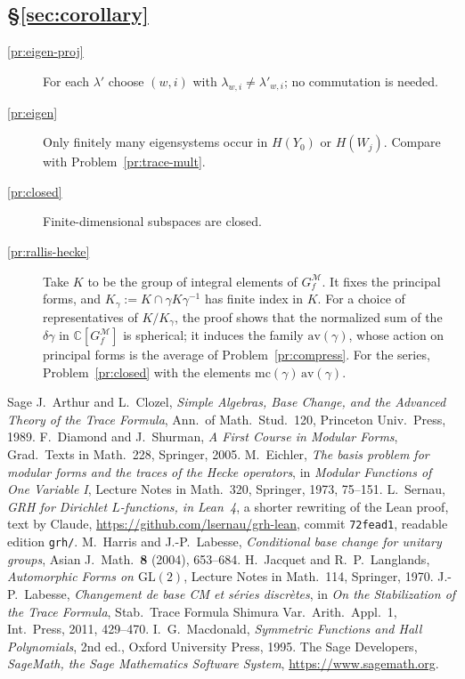 \documentclass[reqno]{amsart}
\theoremstyle{plain}
\theoremstyle{definition}
\newcommand{\C}{\mathbb{C}}
\newcommand{\Mcal}{\mathcal{M}}
\begin{document}
\subsection*{\S\ref{sec:corollary}}
\begin{description}
\item[\ref{pr:eigen-proj}] For each \(\lambda'\) choose \((w, i)\) with \(\lambda_{w,i} \ne \lambda'_{w,i}\); no commutation is needed.
\item[\ref{pr:eigen}] Only finitely many eigensystems occur in \(H(Y_0)\) or \(H(W_j)\).  Compare with Problem~\ref{pr:trace-mult}.
\item[\ref{pr:closed}] Finite-dimensional subspaces are closed.
\item[\ref{pr:rallis-hecke}] Take \(K\) to be the group of integral elements of \(G_f^{\Mcal}\).  It fixes the principal forms, and \(K_\gamma := K \cap \gamma K \gamma^{-1}\) has finite index in \(K\).  For a choice of representatives of \(K/K_\gamma\), the proof shows that the normalized sum of the \(\delta\gamma\) in \(\C[G_f^{\Mcal}]\) is spherical; it induces the family \(\mathrm{av}(\gamma)\), whose action on principal forms is the average of Problem~\ref{pr:compress}.  For the series, Problem~\ref{pr:closed} with the elements \(\mathrm{mc}(\gamma)\,\mathrm{av}(\gamma)\).
\end{description}

{\small
\begin{thebibliography}{Sage}
 J.~Arthur and L.~Clozel, \emph{Simple Algebras, Base Change, and the Advanced Theory of the Trace Formula}, Ann.\ of Math.\ Stud.\ 120, Princeton Univ.\ Press, 1989.
 F.~Diamond and J.~Shurman, \emph{A First Course in Modular Forms}, Grad.\ Texts in Math.\ 228, Springer, 2005.
 M.~Eichler, \emph{The basis problem for modular forms and the traces of the Hecke operators}, in \emph{Modular Functions of One Variable I}, Lecture Notes in Math.\ 320, Springer, 1973, 75--151.
 L.~Sernau, \emph{GRH for Dirichlet \(L\)-functions, in Lean~4}, a shorter rewriting of the Lean proof, text by Claude, \url{https://github.com/lsernau/grh-lean}, commit \texttt{72fead1}, readable edition \texttt{grh/}.
 M.~Harris and J.-P.~Labesse, \emph{Conditional base change for unitary groups}, Asian J.\ Math.\ \textbf{8} (2004), 653--684.
 H.~Jacquet and R.~P.~Langlands, \emph{Automorphic Forms on \(\mathrm{GL}(2)\)}, Lecture Notes in Math.\ 114, Springer, 1970.
 J.-P.~Labesse, \emph{Changement de base CM et s\'eries discr\`etes}, in \emph{On the Stabilization of the Trace Formula}, Stab.\ Trace Formula Shimura Var.\ Arith.\ Appl.\ 1, Int.\ Press, 2011, 429--470.
 I.~G.~Macdonald, \emph{Symmetric Functions and Hall Polynomials}, 2nd ed., Oxford University Press, 1995.
 The Sage Developers, \emph{SageMath, the Sage Mathematics Software System}, \url{https://www.sagemath.org}.
\end{thebibliography}
}
\end{document}
